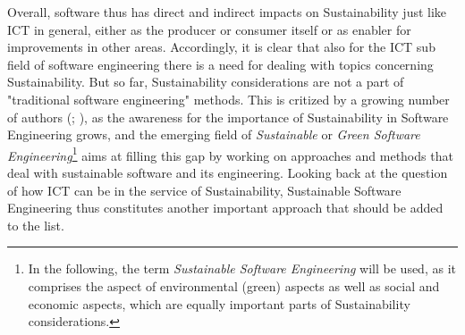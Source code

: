\documentclass[oribibl]{llncs}
\begin{document}
Overall, software thus has direct and indirect impacts on Sustainability just like ICT in general, either as the producer or consumer itself or as enabler for improvements in other areas. %
Accordingly, it is clear that also for the ICT sub field of software engineering %
there is a need for dealing with topics concerning Sustainability. But so far, Sustainability considerations are not a part of "traditional software engineering" \cite{penzenstadler_supporting_2012} methods.  This is critized by a growing number of authors (\cite{penzenstadler_supporting_2012}; \cite{agarwal_sustainable_2012}), %
 as the awareness for the importance of Sustainability in Software Engineering grows, and the emerging field of \textit{Sustainable} or \textit{Green Software Engineering}\footnote{In the following, the term \textit{Sustainable Software Engineering} will be used, as it comprises the aspect of environmental (green) aspects as well as social and economic aspects, which are equally important parts of Sustainability considerations.} %
 aims at filling this gap by %
working on approaches and methods that deal with sustainable software and its engineering. %
Looking back at the question of how ICT can be in the service of Sustainability, %
 Sustainable Software Engineering thus constitutes another important approach that should be added to the list.\\
\end{document}

